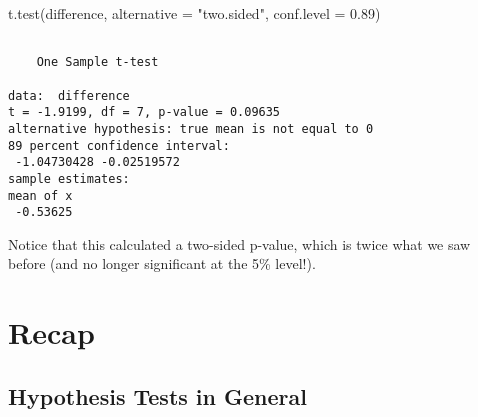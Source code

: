 \documentclass[
  letterpaper,
  DIV=11,
  numbers=noendperiod]{scrreprt}
\newenvironment{Shaded}{\begin{snugshade}}{\end{snugshade}}
\newcommand{\AttributeTok}[1]{\textcolor[rgb]{0.40,0.45,0.13}{#1}}
\newcommand{\FloatTok}[1]{\textcolor[rgb]{0.68,0.00,0.00}{#1}}
\newcommand{\FunctionTok}[1]{\textcolor[rgb]{0.28,0.35,0.67}{#1}}
\newcommand{\NormalTok}[1]{\textcolor[rgb]{0.00,0.23,0.31}{#1}}
\newcommand{\StringTok}[1]{\textcolor[rgb]{0.13,0.47,0.30}{#1}}
\begin{document}
\begin{Shaded}
\begin{Highlighting}[]
\FunctionTok{t.test}\NormalTok{(difference, }\AttributeTok{alternative =} \StringTok{"two.sided"}\NormalTok{, }\AttributeTok{conf.level =} \FloatTok{0.89}\NormalTok{)}
\end{Highlighting}
\end{Shaded}

\begin{verbatim}

    One Sample t-test

data:  difference
t = -1.9199, df = 7, p-value = 0.09635
alternative hypothesis: true mean is not equal to 0
89 percent confidence interval:
 -1.04730428 -0.02519572
sample estimates:
mean of x 
 -0.53625 
\end{verbatim}

Notice that this calculated a two-sided p-value, which is twice what we
saw before (and no longer significant at the 5\% level!).

\hypertarget{recap-1}{%
\chapter{Recap}\label{recap-1}}

\hypertarget{hypothesis-tests-in-general}{%
\section{Hypothesis Tests in
General}\label{hypothesis-tests-in-general}}
\end{document}
